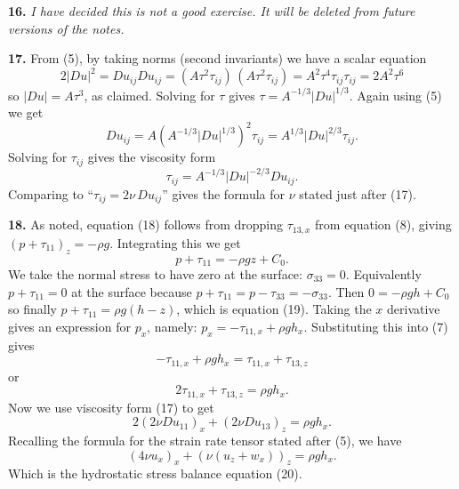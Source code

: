 \documentclass[10pt]{amsart}
\newcommand{\prob}[1]{\bigskip\noindent\large\textbf{#1.}\normalsize }
\begin{document}
\prob{16}  \emph{I have decided this is not a good exercise.  It will be deleted from future versions of the notes.}

\prob{17}  From (5), by taking norms (second invariants) we have a scalar equation
    $$2 |Du|^2 = Du_{ij} Du_{ij} = (A \tau^2 \tau_{ij})\,(A \tau^2 \tau_{ij}) = A^2 \tau^4 \tau_{ij} \tau_{ij} = 2 A^2 \tau^6$$
so $|Du|=A\tau^3$, as claimed.  Solving for $\tau$ gives $\tau = A^{-1/3} |Du|^{1/3}$.  Again using (5) we get
    $$Du_{ij} = A \left(A^{-1/3} |Du|^{1/3}\right)^2 \tau_{ij} = A^{1/3} |Du|^{2/3} \tau_{ij}.$$
Solving for $\tau_{ij}$ gives the viscosity form
    $$\tau_{ij} = A^{-1/3} |Du|^{-2/3} Du_{ij}.$$
Comparing to ``$\tau_{ij} = 2 \nu\, Du_{ij}$'' gives the formula for $\nu$ stated just after (17).

\prob{18}  As noted, equation (18) follows from dropping $\tau_{13,x}$ from equation (8), giving $(p+\tau_{11})_z = -\rho g$.  Integrating this we get
    $$p+\tau_{11} = -\rho g z + C_0.$$
We take the normal stress to have zero at the surface: $\sigma_{33} = 0$.  Equivalently $p+\tau_{11}=0$ at the surface because $p+\tau_{11} = p-\tau_{33} = -\sigma_{33}$.  Then $0=-\rho g h + C_0$ so finally $p + \tau_{11} = \rho g (h-z)$, which is equation (19).  Taking the $x$ derivative gives an expression for $p_x$, namely: $p_x = -\tau_{11,x} + \rho g h_x$.  Substituting this into (7) gives
    $$-\tau_{11,x} + \rho g h_x = \tau_{11,x} + \tau_{13,z}$$
or
    $$2 \tau_{11,x} + \tau_{13,z} = \rho g h_x.$$
Now we use viscosity form (17) to get
    $$2 \left(2 \nu Du_{11}\right)_x + \left(2 \nu Du_{13}\right)_z = \rho g h_x.$$
Recalling the formula for the strain rate tensor stated after (5), we have
    $$\left(4 \nu u_x\right)_x + \left(\nu (u_z + w_x)\right)_z = \rho g h_x.$$
Which is the hydrostatic stress balance equation (20).
\end{document}
